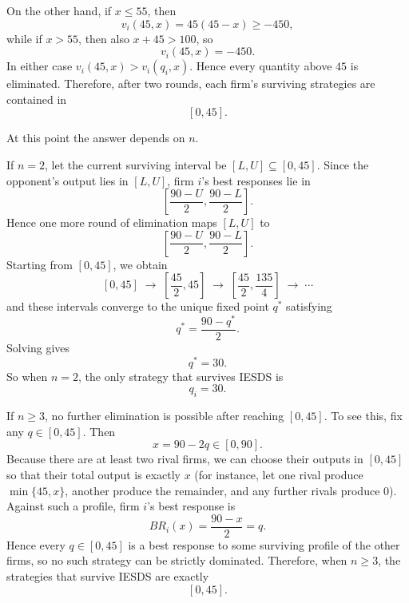 \documentclass[12pt,a4paper]{article}
\begin{document}
\begin{enumerate}[label=(\alph*)]
  On the other hand, if $x\le 55$, then
  \[
    v_i(45,x)=45(45-x)\ge -450,
  \]
  while if $x>55$, then also $x+45>100$, so
  \[
    v_i(45,x)=-450.
  \]
  In either case $v_i(45,x)>v_i(q_i,x)$. Hence every quantity above $45$ is eliminated. Therefore, after two rounds, each firm's surviving strategies are contained in
  \[
    [0,45].
  \]

  At this point the answer depends on $n$.

  If $n=2$, let the current surviving interval be $[L,U]\subseteq[0,45]$. Since the opponent's output lies in $[L,U]$, firm $i$'s best responses lie in
  \[
    \left[\frac{90-U}{2},\frac{90-L}{2}\right].
  \]
  Hence one more round of elimination maps $[L,U]$ to
  \[
    \left[\frac{90-U}{2},\frac{90-L}{2}\right].
  \]
  Starting from $[0,45]$, we obtain
  \[
    [0,45]\;\to\;\left[\frac{45}{2},45\right]\;\to\;\left[\frac{45}{2},\frac{135}{4}\right]\;\to\;\cdots
  \]
  and these intervals converge to the unique fixed point $q^*$ satisfying
  \[
    q^*=\frac{90-q^*}{2}.
  \]
  Solving gives
  \[
    q^*=30.
  \]
  So when $n=2$, the only strategy that survives IESDS is
  \[
    q_i=30.
  \]

  If $n\ge 3$, no further elimination is possible after reaching $[0,45]$. To see this, fix any $q\in[0,45]$. Then
  \[
    x=90-2q\in[0,90].
  \]
  Because there are at least two rival firms, we can choose their outputs in $[0,45]$ so that their total output is exactly $x$ (for instance, let one rival produce $\min\{45,x\}$, another produce the remainder, and any further rivals produce $0$). Against such a profile, firm $i$'s best response is
  \[
    BR_i(x)=\frac{90-x}{2}=q.
  \]
  Hence every $q\in[0,45]$ is a best response to some surviving profile of the other firms, so no such strategy can be strictly dominated. Therefore, when $n\ge 3$, the strategies that survive IESDS are exactly
  \[
    [0,45].
  \]
\end{enumerate}

\end{document}
